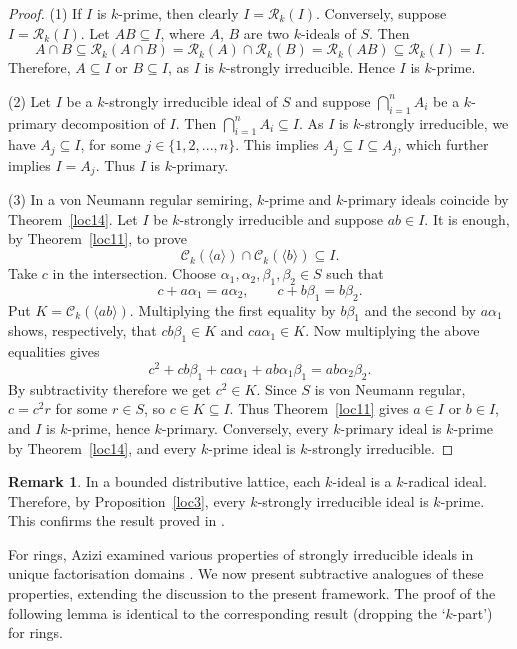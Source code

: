 \documentclass[11pt,leqno]{amsart}
\theoremstyle{definition}
\newtheorem{remark}[theorem]{Remark}
\numberwithin{equation}{section}
\begin{document}
\begin{proof}
	(1) If $I$ is $k$-prime, then clearly $I=\mathcal{R}_k(I)$. Conversely, suppose $I=\mathcal{R}_k(I)$. Let $AB \subseteq I$, where $A$, $B$ are two $k$-ideals of $S$. Then \[A\cap B \subseteq \mathcal{R}_k(A\cap B)=\mathcal{R}_k(A)\cap \mathcal{R}_k(B)=\mathcal{R}_k(AB)\subseteq \mathcal{R}_k(I)=I.\] Therefore, $A \subseteq I$ or $B \subseteq I$, as $I$ is $k$-strongly irreducible. Hence $I$ is $k$-prime.
    
        (2) Let $I$ be a $k$-strongly irreducible ideal of $S$ and suppose $\bigcap\limits_{i=1}^n A_i$ be a $k$-primary decomposition  of $I$. Then $\bigcap\limits_{i=1}^n A_i \subseteq I$. As $I$ is $k$-strongly irreducible, we have $A
        _j \subseteq I$, for some $j\in \{1,2,...,n\}$. This implies $A_j \subseteq I \subseteq A_j$, which further implies $I=A_j$. Thus $I$ is $k$-primary.
        
        (3) In a von Neumann regular semiring, $k$-prime and $k$-primary ideals coincide by Theorem~\ref{loc14}. Let $I$ be $k$-strongly irreducible and suppose $ab\in I$. It is enough, by Theorem~\ref{loc11}, to prove
\[
\mathcal C_k(\langle a\rangle)\cap\mathcal C_k(\langle b\rangle)\subseteq I.
\]
Take $c$ in the intersection. Choose $\alpha_1,\alpha_2,\beta_1,\beta_2\in S$ such that
\[
c+a\alpha_1=a\alpha_2,\qquad c+b\beta_1=b\beta_2.
\]
Put $K=\mathcal C_k(\langle ab\rangle)$. Multiplying the first equality by $b\beta_1$ and the second by $a\alpha_1$ shows, respectively, that $cb\beta_1\in K$ and $ca\alpha_1\in K$. Now multiplying the above equalities gives
\[
c^2+cb\beta_1+ca\alpha_1+ab\alpha_1\beta_1=ab\alpha_2\beta_2.
\]
By subtractivity therefore we get $c^2\in K$. Since $S$ is von Neumann regular, $c=c^2r$ for some $r\in S$, so $c\in K\subseteq I$. Thus Theorem~\ref{loc11} gives $a\in I$ or $b\in I$, and $I$ is $k$-prime, hence $k$-primary. Conversely, every $k$-primary ideal is $k$-prime by Theorem~\ref{loc14}, and every $k$-prime ideal is $k$-strongly irreducible.
\end{proof}

\begin{remark}
    In a bounded distributive lattice, each $k$-ideal is a $k$-radical ideal. Therefore, by Proposition~\ref{loc3}, every $k$-strongly irreducible ideal is $k$-prime. This confirms the result proved in \cite[Theorem 5]{Iseki56}.
\end{remark}

For rings, Azizi examined various properties of strongly irreducible ideals in unique factorisation domains \cite[Theorem 2.2]{Azizi08}. We now present subtractive analogues of these properties, extending the discussion to the present framework. The proof of the following lemma is identical to the corresponding result (dropping the `$k$-part') for rings.
\end{document}
